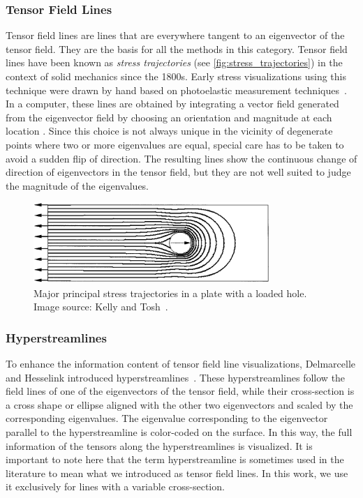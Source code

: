 \subsubsection{Tensor Field Lines} %
%
Tensor field lines are lines that are everywhere tangent to an eigenvector of
the tensor field.
%
They are the basis for all the methods in this category.
%
Tensor field lines have been known as \emph{stress trajectories} (see
\autoref{fig:stress_trajectories}) in the context of solid mechanics since the
1800s.
%
Early stress visualizations using this technique were drawn by hand based on
photoelastic measurement techniques~\cite{Focht1962,Timoshenko1983}.
%
In a computer, these lines are obtained by integrating a vector field generated
from the eigenvector field by choosing an orientation and magnitude at each
location \cite{Dickinson1989,Tricoche2006}.
%
Since this choice is not always unique in the vicinity of degenerate points
where two or more eigenvalues are equal, special care has to be taken to avoid
a sudden flip of direction.
%
The resulting lines show the continuous change of direction of eigenvectors in
the tensor field, but they are not well suited to judge the magnitude of the
eigenvalues.
%
\begin{figure}[t]
    \centering
    \includegraphics[width=0.8\textwidth]{figures/stress_trajectories.png}
    \caption{Major principal stress trajectories in a plate with a loaded hole.
             Image source: Kelly and Tosh~\cite{Kelly2000}.}
    \label{fig:stress_trajectories}
\end{figure}
%

\subsubsection{Hyperstreamlines} %
%
To enhance the information content of tensor field line visualizations,
Delmarcelle and Hesselink introduced hyperstreamlines~\cite{Delmarcelle1993}.
%
These hyperstreamlines follow the field lines of one of the eigenvectors of the
tensor field, while their cross-section is a cross shape or ellipse aligned with
the other two eigenvectors and scaled by the corresponding eigenvalues.
%
The eigenvalue corresponding to the eigenvector parallel to the hyperstreamline
is color-coded on the surface.
%
In this way, the full information of the tensors along the hyperstreamlines is
visualized.
%
It is important to note here that the term hyperstreamline is sometimes used
in the literature to mean what we introduced as tensor field lines.
%
In this work, we use it exclusively for lines with a variable cross-section.
%

